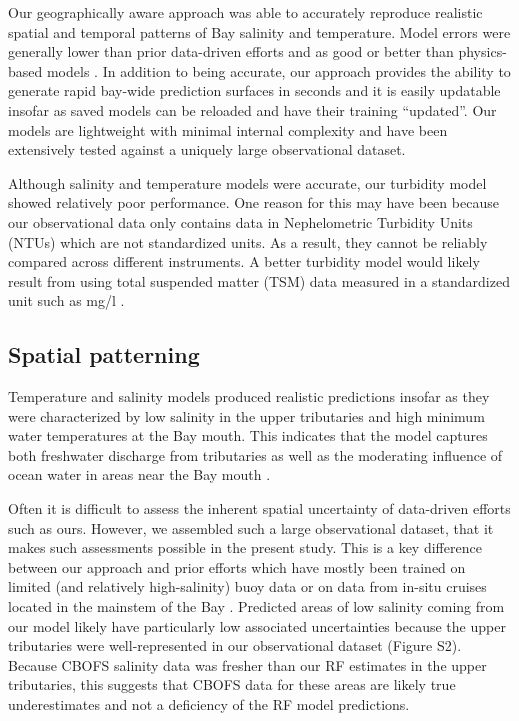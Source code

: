 \documentclass{article}
\begin{document}
Our geographically aware approach was able to accurately reproduce realistic spatial and temporal patterns of Bay salinity and temperature. Model errors were generally lower than prior data-driven efforts and as good or better than physics-based models \citep{vogelAssessingSatelliteSea2016}. In addition to being accurate, our approach provides the ability to generate rapid bay-wide prediction surfaces in seconds and it is easily updatable insofar as saved models can be reloaded and have their training “updated”. Our models are lightweight with minimal internal complexity and have been extensively tested against a uniquely large observational dataset.

Although salinity and temperature models were accurate, our turbidity model showed relatively poor performance. One reason for this may have been because our observational data only contains data in Nephelometric Turbidity Units (NTUs) which are not standardized units. As a result, they cannot be reliably compared across different instruments. A better turbidity model would likely result from using total suspended matter (TSM) data measured in a standardized unit such as mg/l \citep{ondrusekDevelopmentNewOptical2012}. 

\subsection{Spatial patterning}

Temperature and salinity models produced realistic predictions insofar as they were characterized by low salinity in the upper tributaries and high minimum water temperatures at the Bay mouth. This indicates that the model captures both freshwater discharge from tributaries as well as the moderating influence of ocean water in areas near the Bay mouth \citep{dingSpatiotemporalPatternsWater2015}.

Often it is difficult to assess the inherent spatial uncertainty of data-driven efforts such as ours. However, we assembled such a large observational dataset, that it makes such assessments possible in the present study. This is a key difference between our approach and prior efforts which have mostly been trained on limited (and relatively high-salinity) buoy data or on data from in-situ cruises located in the mainstem of the Bay \citep{vogelAssessingSatelliteSea2016, geigerSatellitederivedCoastalOcean2013, ondrusekDevelopmentNewOptical2012}. Predicted areas of low salinity coming from our model likely have particularly low associated uncertainties because the upper tributaries were well-represented in our observational dataset (Figure S2). Because CBOFS salinity data was fresher than our RF estimates in the upper tributaries, this suggests that CBOFS data for these areas are likely true underestimates and not a deficiency of the RF model predictions.
\end{document}
